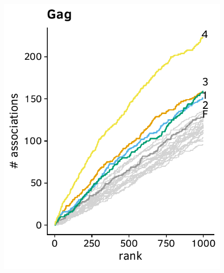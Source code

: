 \documentclass[a4paper,11pt]{article}
\begin{document}
\begin{figure}[H]
    \begin{minipage}{.40\textwidth}
      \includegraphics[width=\linewidth]{plots/comparison_plots/hiv_china/gag_new_map.pdf}
    \end{minipage}%
    \hfill
    \begin{minipage}{.40\textwidth}

\end{minipage}
\end{figure}
\end{document}
